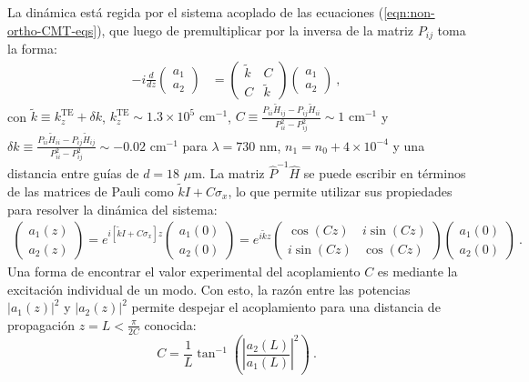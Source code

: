 La dinámica está regida por el sistema acoplado de las ecuaciones (\ref{eqn:non-ortho-CMT-eqs}), que luego de premultiplicar por la inversa de la matriz $P_{ij}$ toma la forma:
\begin{align*}
	-i\frac{d}{dz}\begin{pmatrix}
	a_1
	\\
	a_2
	\end{pmatrix} &= 	
	\begin{pmatrix}
	\tilde{k} & C
	\\
	C & \tilde{k}
	\end{pmatrix}
	\begin{pmatrix}
	a_1
	\\
	a_2
	\end{pmatrix} \ ,
\end{align*}
con $\tilde{k}\equiv k_z^{\text{TE}} + \delta k$, $k_z^{\text{TE}} \sim 1.3\times10^5 \text{ cm}^{-1}$, $C\equiv \frac{P_{ii} \tilde{H}_{ij}  -P_{ij}\tilde{H}_{ii}}{P_{ii}^2-P_{ij}^2} \sim 1\text{ cm}^{-1}$ y $\delta k \equiv \frac{P_{ii} \tilde{H}_{ii} -P_{ij}\tilde{H}_{ij}}{P_{ii}^2-P_{ij}^2} \sim -0.02\text{ cm}^{-1}$ para $\lambda = 730$ nm, $n_1 = n_0 + 4\times10^{-4}$ y una distancia entre guías de $d = 18 $ $\mu$m. La matriz $\hat{P}^{-1}\hat{H}$ se puede escribir en términos de las matrices de Pauli como $\tilde{k}I + C\sigma_x $, lo que permite utilizar sus propiedades para resolver la dinámica del sistema:
\begin{align*}
	\begin{pmatrix}
	a_1(z)
	\\
	a_2(z)
	\end{pmatrix}
	=
	e^{{i\left[\tilde{k}I + C\sigma_x\right]z }}	\begin{pmatrix}
	a_1(0)
	\\
	a_2(0)
	\end{pmatrix}
	=
	e^{i\tilde{k}z}
	\begin{pmatrix}
	\cos(Cz) & i\sin(Cz)
	\\
	i\sin(Cz) & \cos(Cz)
	\end{pmatrix}
	\begin{pmatrix}
	a_1(0)
	\\
	a_2(0)
	\end{pmatrix} \ .
\end{align*}
Una forma de encontrar el valor experimental del acoplamiento $C$ es mediante la excitación individual de un modo. Con esto, la razón entre las potencias $|a_1(z)|^2$ y $|a_2(z)|^2$ permite despejar el acoplamiento para una distancia de propagación $z=L<\frac{\pi}{2C}$ conocida:
\begin{equation}
	C = \frac{1}{L}\tan^{-1}\left( \left|\frac{a_2(L)}{a_1(L)}\right|^2 \right) \ . \label{eqn:coupling-simp}
\end{equation}

